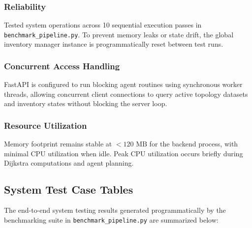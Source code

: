 \subsubsection{Reliability}
Tested system operations across 10 sequential execution passes in \texttt{benchmark\_pipeline.py}. To prevent memory leaks or state drift, the global inventory manager instance is programmatically reset between test runs.

\subsubsection{Concurrent Access Handling}
FastAPI is configured to run blocking agent routines using synchronous worker threads, allowing concurrent client connections to query active topology datasets and inventory states without blocking the server loop.

\subsubsection{Resource Utilization}
Memory footprint remains stable at \textbf{$< 120\text{ MB}$} for the backend process, with minimal CPU utilization when idle. Peak CPU utilization occurs briefly during Dijkstra computations and agent planning.

\subsection[System Test Case Tables]{System Test Case Tables}
The end-to-end system testing results generated programmatically by the benchmarking suite in \texttt{benchmark\_pipeline.py} are summarized below:

